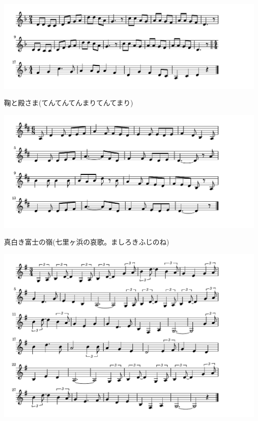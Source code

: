 \documentclass[a4paper]{ltjsarticle}
\begin{document}
\includegraphics[clip]{maritotonosama_crop.pdf}

\vspace{-10mm} \hspace{10mm}
鞠と殿さま(てんてんてんまりてんてまり)

\includegraphics[clip]{mashiroki_crop.pdf}

\vspace{-10mm} \hspace{10mm}
真白き富士の嶺(七里ヶ浜の哀歌。ましろきふじのね)

\includegraphics[clip]{tennessee_crop.pdf}
\end{document}
